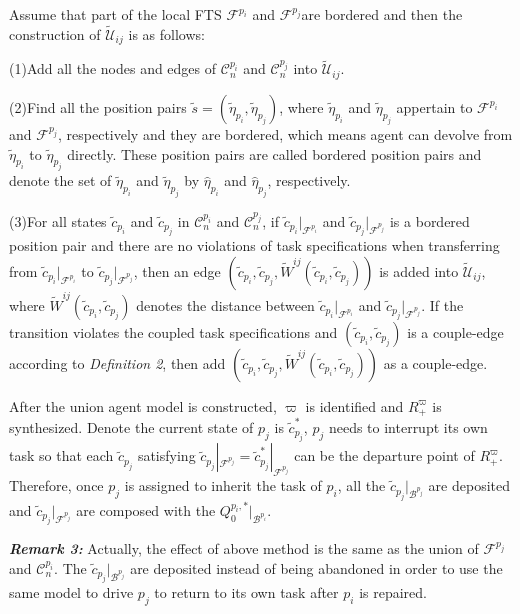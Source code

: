 \documentclass[journal]{IEEEtran}
\begin{document}
Assume that part of the local FTS $\mathcal{F}^{p_i}$ and $\mathcal{F}^{p_j}$are bordered and then the construction of $\widetilde{\mathcal{U}}_{ij}$ is as follows:\par
(1)Add all the nodes and edges of $\mathcal{C}^{p_i}_n$ and $\mathcal{C}^{p_j}_n$ into $\widetilde{\mathcal{U}}_{ij}$.\par
(2)Find all the position pairs $\tilde{s}=(\tilde{\eta}_{p_i},\tilde{\eta}_{p_j})$, where $\tilde{\eta}_{p_i}$ and $\tilde{\eta}_{p_j}$ appertain to $\mathcal{F}^{p_i}$ and $\mathcal{F}^{p_j}$, respectively and they are bordered, which means agent can devolve from $\tilde{\eta}_{p_i}$ to $\tilde{\eta}_{p_j}$ directly. These position pairs are called bordered position pairs and denote the set of $\tilde{\eta}_{p_i}$ and $\tilde{\eta}_{p_j}$ by $\hat{\eta}_{p_i}$ and $\hat{\eta}_{p_j}$, respectively.\par
(3)For all states $\tilde{c}_{p_i}$ and $\tilde{c}_{p_j}$ in $\mathcal{C}^{p_i}_n$ and $\mathcal{C}^{p_j}_n$, if $\tilde{c}_{p_i}|_{\mathcal{F}^{p_i}}$ and $\tilde{c}_{p_j}|_{\mathcal{F}^{p_j}}$ is a bordered position pair and there are no violations of task specifications when transferring from $\tilde{c}_{p_i}|_{\mathcal{F}^{p_i}}$ to $\tilde{c}_{p_j}|_{\mathcal{F}^{p_j}}$, then an edge $(\tilde{c}_{p_i},\tilde{c}_{p_j},\widetilde{W}^{ij}(\tilde{c}_{p_i},\tilde{c}_{p_j}))$ is added into $\widetilde{\mathcal{U}}_{ij}$, where $\widetilde{W}^{ij}(\tilde{c}_{p_i},\tilde{c}_{p_j})$ denotes the distance between $\tilde{c}_{p_i}|_{\mathcal{F}^{p_i}}$ and $\tilde{c}_{p_j}|_{\mathcal{F}^{p_j}}$. If the transition violates the coupled task specifications and $(\tilde{c}_{p_i},\tilde{c}_{p_j})$ is a couple-edge according to \emph{Definition 2}, then add $(\tilde{c}_{p_i},\tilde{c}_{p_j},\widetilde{W}^{ij}(\tilde{c}_{p_i},\tilde{c}_{p_j}))$ as a couple-edge.\par
After the union agent model is constructed, $\varpi$ is identified and $R^{\varpi}_+$ is synthesized. Denote the current state of $p_j$ is $\tilde{c}_{p_j}^{\ast}$, $p_j$ needs to interrupt its own task so that each $\tilde{c}_{p_j}$ satisfying $\tilde{c}_{p_j}|_{\mathcal{F}^{p_j}}=\tilde{c}_{p_j}^{\ast}|_{\mathcal{F}^{p_j}}$ can be the departure point of $R^{\varpi}_+$. Therefore, once $p_j$ is assigned to inherit the task of $p_i$, all the $\tilde{c}_{p_j}|_{\mathcal{B}^{p_j}}$ are deposited and $\tilde{c}_{p_j}|_{\mathcal{F}^{p_j}}$ are composed with the $Q^{p_i,\ast}_0|_{\mathcal{B}^{p_i}}$.

\textbf{\emph{Remark 3:}} Actually, the effect of above method is the same as the union of $\mathcal{F}^{p_j}$ and $\mathcal{C}^{p_i}_n$. The $\tilde{c}_{p_j}|_{\mathcal{B}^{p_j}}$ are deposited instead of being abandoned in order to use the same model to drive $p_j$ to return to its own task after $p_i$ is repaired.
\end{document}
